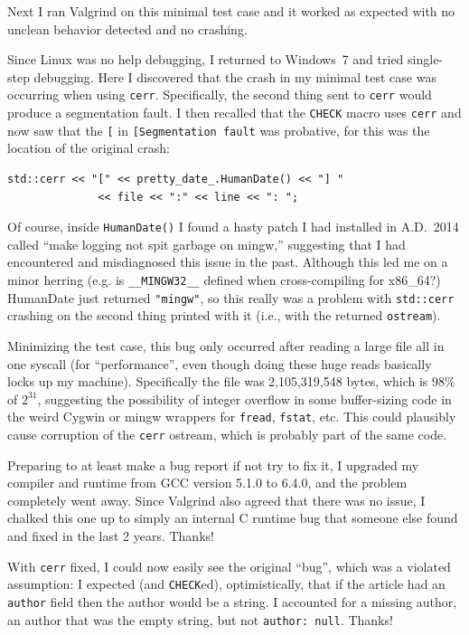 \documentclass[twocolumn]{article}
\begin{document}
Next I ran Valgrind on this minimal test case and it worked as
expected with no unclean behavior detected and no crashing.

Since Linux was no help debugging, I returned to Windows~7 and tried
single-step debugging. Here I discovered that the crash in my minimal
test case was occurring when using \verb+cerr+. Specifically, the
second thing sent to \verb+cerr+ would produce a segmentation fault. I
then recalled that the \verb+CHECK+ macro uses \verb+cerr+ and now saw that
the \verb+[+ in \verb+[Segmentation fault+ was probative, for this
was the location of the original crash:
\begin{Verbatim}[fontsize=\small]
    std::cerr << "[" << pretty_date_.HumanDate() << "] "
              << file << ":" << line << ": ";
\end{Verbatim}

Of course, inside \verb+HumanDate()+ I found a hasty patch I had
installed in A.D.~2014 called ``make logging not spit garbage on
mingw,'' suggesting that I had encountered and misdiagnosed this issue
in the past. Although this led me on a minor herring (e.g. is
\verb+__MINGW32__+ defined when cross-compiling for x86\_64?)
HumanDate just returned \verb+"mingw"+, so this really was a problem
with \verb+std::cerr+ crashing on the second thing printed with it
(i.e., with the returned \verb+ostream+).

Minimizing the test case, this bug only occurred after reading a large
file all in one syscall (for ``performance'', even though doing these
huge reads basically locks up my machine). Specifically the file was
2,105,319,548 bytes, which is $98\%$ of $2^{31}$, suggesting the
possibility of integer overflow in some buffer-sizing code in the
weird Cygwin or mingw wrappers for \verb+fread+, \verb+fstat+, etc.
This could plausibly cause corruption of the \verb+cerr+ ostream,
which is probably part of the same code.

Preparing to at least make a bug report if not try to fix it, I
upgraded my compiler and runtime from GCC version 5.1.0 to 6.4.0,
and the problem completely went away. Since Valgrind also agreed
that there was no issue, I chalked this one up to simply an internal
C runtime bug that someone else found and fixed in the last 2 years.
Thanks!

With \verb+cerr+ fixed, I could now easily see the original ``bug'',
which was a violated assumption: I expected (and \verb+CHECK+ed),
optimistically, that if the article had an {\tt author} field then the
author would be a string. I accounted for a missing author, an author
that was the empty string, but not {\tt author: null}. Thanks!
\end{document}
